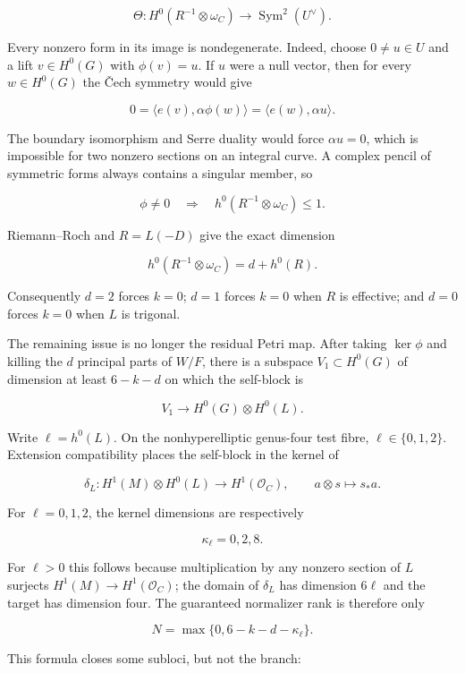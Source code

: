 \documentclass[11pt]{article}
\theoremstyle{definition}
\begin{document}
\[\Theta:H^0(R^{-1}\otimes\omega_C)
\longrightarrow\operatorname{Sym}^2(U^\vee).\]

Every nonzero form in its image is nondegenerate. Indeed, choose
\(0\ne u\in U\) and a lift \(v\in H^0(G)\) with \(\phi(v)=u\). If \(u\)
were a null vector, then for every \(w\in H^0(G)\) the \v{C}ech symmetry
would give

\[0=\langle e(v),\alpha\phi(w)\rangle
 =\langle e(w),\alpha u\rangle.\]

The boundary isomorphism and Serre duality would force \(\alpha u=0\),
which is impossible for two nonzero sections on an integral curve. A
complex pencil of symmetric forms always contains a singular member, so

\[\phi\ne0\quad\Longrightarrow\quad
h^0(R^{-1}\otimes\omega_C)\le1.\]

Riemann--Roch and \(R=L(-D)\) give the exact dimension

\[h^0(R^{-1}\otimes\omega_C)=d+h^0(R).\]

Consequently \(d=2\) forces \(k=0\); \(d=1\) forces \(k=0\) when \(R\)
is effective; and \(d=0\) forces \(k=0\) when \(L\) is trigonal.

The remaining issue is no longer the residual Petri map. After taking
\(\ker\phi\) and killing the \(d\) principal parts of \(W/F\), there is
a subspace \(V_1\subset H^0(G)\) of dimension at least \(6-k-d\) on
which the self-block is

\[V_1\longrightarrow H^0(G)\otimes H^0(L).\]

Write \(\ell=h^0(L)\). On the nonhyperelliptic genus-four test fibre,
\(\ell\in\{0,1,2\}\). Extension compatibility places the self-block in
the kernel of

\[\delta_L:H^1(M)\otimes H^0(L)\longrightarrow H^1(\mathcal O_C),
\qquad a\otimes s\longmapsto s_*a.\]

For \(\ell=0,1,2\), the kernel dimensions are respectively

\[\kappa_\ell=0,2,8.\]

For \(\ell>0\) this follows because multiplication by any nonzero
section of \(L\) surjects \(H^1(M)\to H^1(\mathcal O_C)\); the domain of
\(\delta_L\) has dimension \(6\ell\) and the target has dimension four.
The guaranteed normalizer rank is therefore only

\[N=\max\{0,6-k-d-\kappa_\ell\}.\]

This formula closes some subloci, but not the branch:
\end{document}

